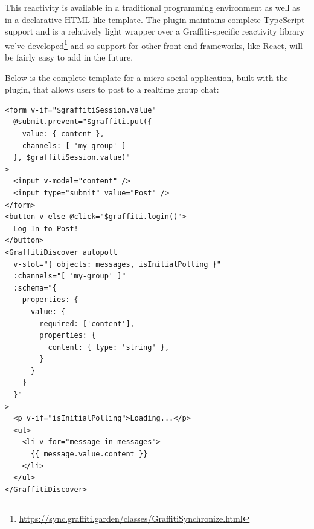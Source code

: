 


This reactivity is available in a traditional programming
environment as well as in a declarative HTML-like template.
The plugin maintains complete TypeScript support and
is a relatively light wrapper over a Graffiti-specific reactivity library we've developed\footnote{
   \url{https://sync.graffiti.garden/classes/GraffitiSynchronize.html}
}
and so support for other front-end frameworks, like React, will be
fairly easy to add in the future.

Below is the complete template for a micro social application,
built with the plugin,
that allows users to post to a realtime
group chat:
\begin{verbatim}
<form v-if="$graffitiSession.value"
  @submit.prevent="$graffiti.put({
    value: { content },
    channels: [ 'my-group' ]
  }, $graffitiSession.value)"
>
  <input v-model="content" />
  <input type="submit" value="Post" />
</form>
<button v-else @click="$graffiti.login()">
  Log In to Post!
</button>
<GraffitiDiscover autopoll
  v-slot="{ objects: messages, isInitialPolling }"
  :channels="[ 'my-group' ]"
  :schema="{
    properties: {
      value: {
        required: ['content'],
        properties: {
          content: { type: 'string' },
        }
      }
    }
  }"
>
  <p v-if="isInitialPolling">Loading...</p>
  <ul>
    <li v-for="message in messages">
      {{ message.value.content }}
    </li>
  </ul>
</GraffitiDiscover>
\end{verbatim}

